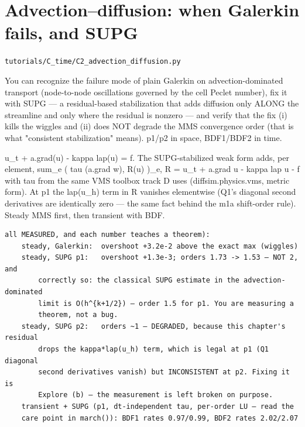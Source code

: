 \chapter{Advection–diffusion: when Galerkin fails, and SUPG}
\label{ch:C2_advection_diffusion}
\noindent\texttt{tutorials/C\_time/C2\_advection\_diffusion.py}\\[0.75em]
\begin{outcome}
You can recognize the failure mode of plain Galerkin on
advection-dominated transport (node-to-node oscillations governed by the
cell Peclet number), fix it with SUPG — a residual-based stabilization
that adds diffusion only ALONG the streamline and only where the residual
is nonzero — and verify that the fix (i) kills the wiggles and (ii) does
NOT degrade the MMS convergence order (that is what "consistent
stabilization" means). p1/p2 in space, BDF1/BDF2 in time.
\end{outcome}

u\_t + a.grad(u) - kappa lap(u) = f. The SUPG-stabilized weak
form adds, per element,
    sum\_e ( tau (a.grad w),  R(u) )\_e,   R = u\_t + a.grad u - kappa lap u - f
with tau from the same VMS toolbox track D uses (diffsim.physics.vms,
metric form). At p1 the lap(u\_h) term in R vanishes elementwise (Q1's
diagonal second derivatives are identically zero — the same fact behind
the m1a shift-order rule). Steady MMS first, then transient with BDF.

\begin{expected}
\begin{verbatim}
all MEASURED, and each number teaches a theorem):
    steady, Galerkin:  overshoot +3.2e-2 above the exact max (wiggles)
    steady, SUPG p1:   overshoot +1.3e-3; orders 1.73 -> 1.53 — NOT 2, and
        correctly so: the classical SUPG estimate in the advection-dominated
        limit is O(h^{k+1/2}) — order 1.5 for p1. You are measuring a
        theorem, not a bug.
    steady, SUPG p2:   orders ~1 — DEGRADED, because this chapter's residual
        drops the kappa*lap(u_h) term, which is legal at p1 (Q1 diagonal
        second derivatives vanish) but INCONSISTENT at p2. Fixing it is
        Explore (b) — the measurement is left broken on purpose.
    transient + SUPG (p1, dt-independent tau, per-order LU — read the
    care point in march()): BDF1 rates 0.97/0.99, BDF2 rates 2.02/2.07
\end{verbatim}
\end{expected}

